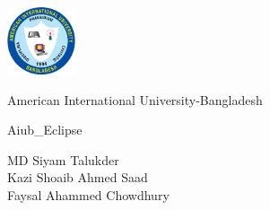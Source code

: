 \begin{titlepage}
\centering
\vspace*{\fill}  %

\includegraphics[width=0.15\textwidth]{images/aiub-logo.png} 
\vspace{0.5cm}  %

{\Huge American International University-Bangladesh \par}
\vspace{1cm}  %

{\Huge Aiub\_Eclipse \par}
\vspace{1cm}  %

{\Large
MD Siyam Talukder \\
Kazi Shoaib Ahmed Saad \\
Faysal Ahammed Chowdhury \par
}

\vspace*{\fill}  %


\end{titlepage}
